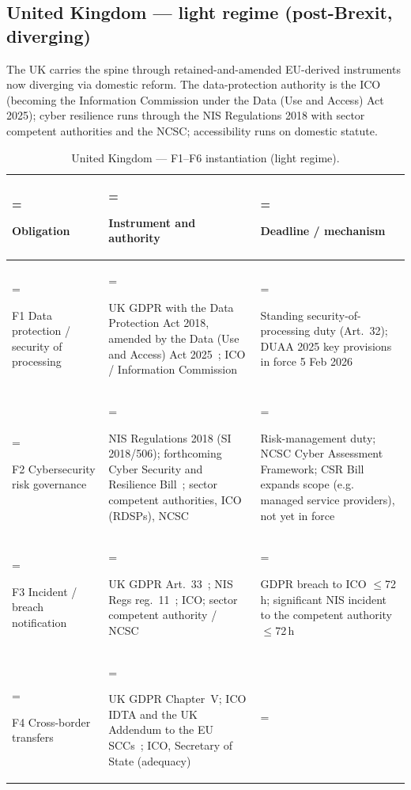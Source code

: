 \subsection{United Kingdom --- light regime (post-Brexit, diverging)}
\label{sec:reg-uk}

The UK carries the spine through retained-and-amended EU-derived
instruments now diverging via domestic reform. The data-protection
authority is the ICO (becoming the Information Commission under the
Data (Use and Access) Act 2025); cyber resilience runs through the NIS
Regulations 2018 with sector competent authorities and the NCSC;
accessibility runs on domestic statute.

\begin{table}[H]
\centering\small
\caption{United Kingdom --- F1--F6 instantiation (light regime).}
\label{tab:reg-uk}
\renewcommand{\arraystretch}{1.25}
\begin{tabularx}{\textwidth}{%
  >{\hsize=0.40\hsize\linewidth=\hsize\bfseries\raggedright\arraybackslash}X%
  >{\hsize=1.42\hsize\linewidth=\hsize\raggedright\arraybackslash}X%
  >{\hsize=1.18\hsize\linewidth=\hsize\raggedright\arraybackslash}X%
}
\toprule
Obligation & Instrument and authority & Deadline / mechanism \\
\midrule
F1 Data protection / security of processing
  & UK GDPR with the Data Protection Act 2018, amended by the Data
    (Use and Access) Act 2025~\cite{uk-gdpr,uk-dpa-2018,uk-duaa-2025};
    ICO / Information Commission
  & Standing security-of-processing duty (Art.~32); DUAA 2025 key
    provisions in force 5 Feb 2026 \\
F2 Cybersecurity risk governance
  & NIS Regulations 2018 (SI 2018/506); forthcoming Cyber Security and
    Resilience Bill~\cite{uk-nis-2018,uk-ncsc,uk-csr-bill}; sector
    competent authorities, ICO (RDSPs), NCSC
  & Risk-management duty; NCSC Cyber Assessment Framework; CSR Bill
    expands scope (e.g. managed service providers), not yet in force \\
F3 Incident / breach notification
  & UK GDPR Art.~33~\cite{uk-gdpr}; NIS Regs reg.~11~\cite{uk-nis-2018};
    ICO; sector competent authority / NCSC
  & GDPR breach to ICO $\le$72\,h; significant NIS incident to the
    competent authority $\le$72\,h \\
F4 Cross-border transfers
  & UK GDPR Chapter~V; ICO IDTA and the UK Addendum to the EU
    SCCs~\cite{uk-idta,uk-gdpr,uk-duaa-2025}; ICO, Secretary of State
    (adequacy)

\end{tabularx}
\end{table}
